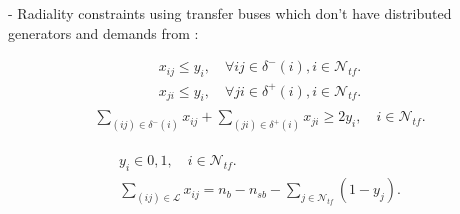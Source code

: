 \documentclass{article}
\begin{document}
{%

}

- Radiality constraints using transfer buses which don't have distributed generators and demands from \cite{5982115}:
{\allowdisplaybreaks
\begin{align}
  x_{ij} \leq y_{i}, \quad \forall ij \in \delta^{-}(i), i \in \mathcal{N}_{tf}.\\
  x_{ji} \leq y_{i}, \quad \forall ji \in \delta^{+}(i), i \in \mathcal{N}_{tf}.
\end{align}
\begin{align}
  \begin{split}
    \sum_{(ij) \in \delta^{-}(i)}x_{ij} + \sum_{(ji) \in \delta^{+}(i)}x_{ji} \geq 2y_{i}, 
    \quad i \in \mathcal{N}_{tf}.
  \end{split}
\end{align}

\begin{align}
  y_{i} \in {0,1}, \quad i \in \mathcal{N}_{tf}.\\
  \sum_{(ij) \in \mathcal{L}}x_{ij} = n_{b} - n_{sb} - \sum_{j \in \mathcal{N}_{tf}} (1-y_{j}).
\end{align}
}
\end{document}
